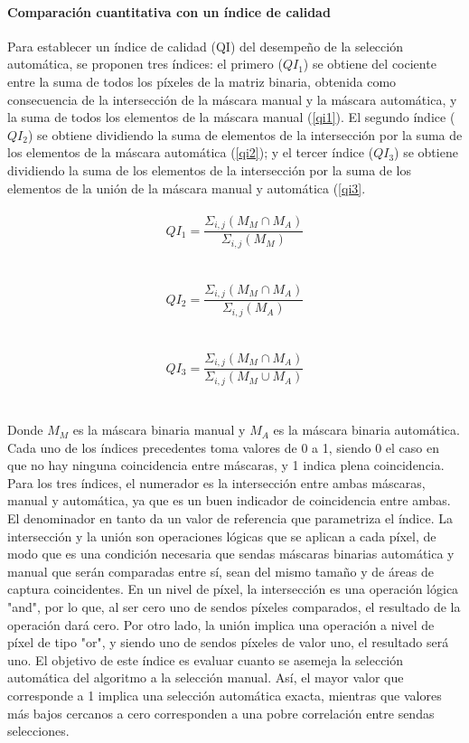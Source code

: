 \paragraph{Comparación cuantitativa con un índice de calidad}
Para establecer un índice de calidad (QI) del desempeño de la selección automática, se proponen tres índices: el primero ($QI_1$) se obtiene del cociente entre la suma de todos los píxeles de la matriz binaria, obtenida como consecuencia de la intersección de la máscara manual y la máscara automática, y la suma de todos los elementos de la máscara manual (\ref{qi1}). El segundo índice ($QI_2$) se obtiene dividiendo la suma de elementos de la intersección por la suma de los elementos de la máscara automática (\ref{qi2}); y el tercer índice ($QI_3$) se obtiene dividiendo la suma de los elementos de la intersección por la suma de los elementos de la unión de la máscara manual y automática (\ref{qi3}.
\\
\\
 \begin{equation}
    QI_1=\frac{\Sigma _{i,j}(M_M\cap M_A )}{\Sigma _{i,j}(M_M ) }
    \label{qi1}
\end{equation}
\\
\\
 \begin{equation}
    QI_2=\frac{\Sigma _{i,j}(M_M\cap M_A )}{\Sigma _{i,j}(M_A ) }
    \label{qi2}
\end{equation}
\\
\\
\begin{equation}
    QI_3=\frac{\Sigma _{i,j}(M_M\cap M_A )}{\Sigma _{i,j}(M_M \cup M_A ) }
    \label{qi3}
\end{equation}
\\
\\
Donde $M_M$ es la máscara binaria manual y $M_A$ es la máscara binaria automática. Cada uno de los índices precedentes toma valores de 0 a 1, siendo 0 el caso en que no hay ninguna coincidencia entre máscaras, y 1 indica plena coincidencia. Para los tres índices, el numerador es la intersección entre ambas máscaras, manual y automática, ya que es un buen indicador de coincidencia entre ambas. El denominador en tanto da un valor de referencia que parametriza el índice. La intersección y la unión son operaciones lógicas que se aplican a cada píxel, de modo que es una condición necesaria que sendas máscaras binarias automática y manual que serán comparadas entre sí, sean del mismo tamaño y de áreas de captura coincidentes. En un nivel de píxel, la intersección es una operación lógica "and", por lo que, al ser cero uno de sendos píxeles comparados, el resultado de la operación dará cero. Por otro lado, la unión implica una operación a nivel de píxel de tipo "or", y siendo uno de sendos píxeles de valor uno, el resultado será uno. El objetivo de este índice es evaluar cuanto se asemeja la selección automática del algoritmo a la selección manual. Así, el mayor valor que corresponde a 1 implica una selección automática exacta, mientras que valores más bajos cercanos a cero corresponden a una pobre correlación entre sendas selecciones.


